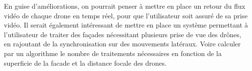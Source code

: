\documentclass[12pt, openany]{report}
\begin{document}
En guise d'améliorations, on pourrait penser à mettre en place un retour du flux vidéo de chaque drone en temps réel, pour que l'utilisateur soit assuré de sa prise vidéo. Il serait également intéressant de mettre en place un système permettant à l'utilisateur de traiter des façades nécessitant plusieurs prise de vue des drônes, en rajoutant de la synchronisation sur des mouvements latéraux. Voire calculer par un algorithme le nombre de traitements nécessaires en fonction de la superficie de la facade et la distance focale des drones. 
\end{document}

